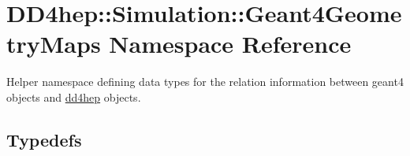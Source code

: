 \hypertarget{namespace_d_d4hep_1_1_simulation_1_1_geant4_geometry_maps}{}\section{D\+D4hep\+:\+:Simulation\+:\+:Geant4\+Geometry\+Maps Namespace Reference}
\label{namespace_d_d4hep_1_1_simulation_1_1_geant4_geometry_maps}


Helper namespace defining data types for the relation information between geant4 objects and \hyperlink{namespacedd4hep}{dd4hep} objects.  


\subsection*{Typedefs}
